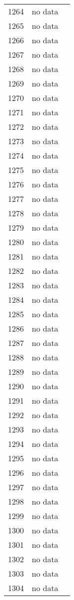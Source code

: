 \begin{table}[p]
\begin{tabular}{rlr}
  1264 & no data &  \\ 
  1265 & no data &  \\ 
  1266 & no data &  \\ 
  1267 & no data &  \\ 
  1268 & no data &  \\ 
  1269 & no data &  \\ 
  1270 & no data &  \\ 
  1271 & no data &  \\ 
  1272 & no data &  \\ 
  1273 & no data &  \\ 
  1274 & no data &  \\ 
  1275 & no data &  \\ 
  1276 & no data &  \\ 
  1277 & no data &  \\ 
  1278 & no data &  \\ 
  1279 & no data &  \\ 
  1280 & no data &  \\ 
  1281 & no data &  \\ 
  1282 & no data &  \\ 
  1283 & no data &  \\ 
  1284 & no data &  \\ 
  1285 & no data &  \\ 
  1286 & no data &  \\ 
  1287 & no data &  \\ 
  1288 & no data &  \\ 
  1289 & no data &  \\ 
  1290 & no data &  \\ 
  1291 & no data &  \\ 
  1292 & no data &  \\ 
  1293 & no data &  \\ 
  1294 & no data &  \\ 
  1295 & no data &  \\ 
  1296 & no data &  \\ 
  1297 & no data &  \\ 
  1298 & no data &  \\ 
  1299 & no data &  \\ 
  1300 & no data &  \\ 
  1301 & no data &  \\ 
  1302 & no data &  \\ 
  1303 & no data &  \\ 
  1304 & no data &  \\ 

\end{tabular}
\end{table}
